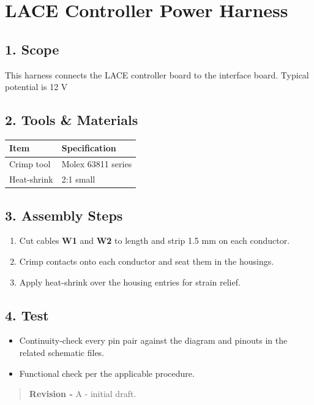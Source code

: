 \hypertarget{lace-controller-power-harness}{%
\section{LACE Controller Power Harness}\label{lace-controller-power-harness}}

\hypertarget{1-scope}{%
\subsection{1. Scope}\label{1-scope}}

This harness connects the LACE controller board to the interface board. Typical potential is 12 V

\hypertarget{2-tools--materials}{%
\subsection{2. Tools \& Materials}\label{2-tools--materials}}

\begin{longtable}[]{@{}ll@{}}
\toprule
Item & Specification\tabularnewline
\midrule
\endhead
Crimp tool & Molex 63811 series\tabularnewline
Heat-shrink & 2:1 small\tabularnewline
\bottomrule
\end{longtable}

\hypertarget{3-assembly-steps}{%
\subsection{3. Assembly Steps}\label{3-assembly-steps}}

\begin{enumerate}
\def\labelenumi{\arabic{enumi}.}
\tightlist
\item
  Cut cables \textbf{W1} and \textbf{W2} to length and strip 1.5 mm on each conductor.
\item
  Crimp contacts onto each conductor and seat them in the housings.
\item
  Apply heat-shrink over the housing entries for strain relief.
\end{enumerate}

\hypertarget{4-test}{%
\subsection{4. Test}\label{4-test}}

\begin{itemize}
\tightlist
\item
  Continuity-check every pin pair against the diagram and pinouts in the related schematic files.
\item
  Functional check per the applicable procedure.
\end{itemize}

\begin{quote}
\textbf{Revision -} A - initial draft.
\end{quote}
